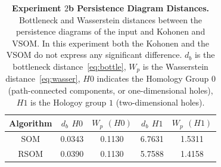 \begin{table}[!ht]
  \begin{center}
    \begin{tabular}{ccccc}
        \textbf{Algorithm} & $d_b$ $H0$ & $W_p$ $(H0)$ & $d_b$ $H1$ & $W_p$ $(H1)$ \\
        \hline
         SOM & 0.0343 & 0.1130 & 6.7631 & 1.5311 \\
        RSOM & 0.0390 & 0.1130 & 5.7588 & 1.4158
      \end{tabular}
      \caption{\textbf{Experiment $2$b Persistence Diagram Distances.} Bottleneck 
      and Wasserstein distances between the persistence diagrams of the input and 
      Kohonen and VSOM. In this experiment both the Kohonen and the VSOM do not express
      any significant difference. $d_b$ is the bottleneck distance~\eqref{eq:bottle},
      $W_p$ is the Wasserstein distance~\eqref{eq:wasser}, $H0$ indicates the Homology Group $0$
      (path-connected components, or one-dimensional holes), $H1$ is the Hologoy group $1$ 
      (two-dimensional holes).}
      \label{table:parameters}
  \end{center}
\end{table}